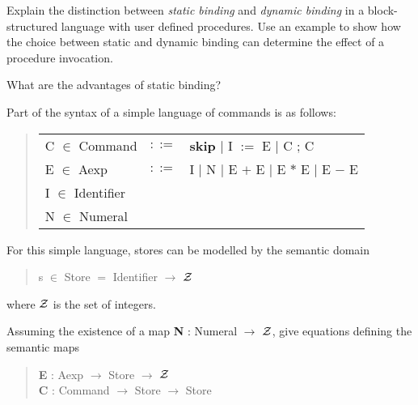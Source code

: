 \begin{questions}
\begin{subquestions}
		\subquestion

Explain the distinction between {\em static binding} and {\em dynamic binding}
in a block-structured language with user defined procedures.
Use an example to show how the choice between static and dynamic binding can
determine the effect of a procedure invocation.

What are the advantages of static binding?

	\end{subquestions}

	\question

Part of the syntax of a simple language of commands is as follows:

	\begin{quote}
	\begin{tabular}{lcl}
	 C $\in$ Command	&$::=$& {\bf skip}
				$\vert$ I $:=$ E
				$\vert$ C ; C \\
	 E $\in$ Aexp		&$::=$& I
				$\vert$ N
				$\vert$ E $+$ E
				$\vert$ E $*$ E
				$\vert$ E $-$ E	\\
	 I $\in$ Identifier \\
	 N $\in$ Numeral
        \end{tabular}
        \end{quote}

For this simple language, stores can be modelled by the semantic domain
        \begin{quote}
         s $\in$ Store $=$ Identifier $\rightarrow$ ${\cal Z}$
        \end{quote}
where ${\cal Z}$ is the set of integers.

	\begin{subquestions}

                \subquestion

Assuming the existence of a map
{\bf N} : Numeral $\rightarrow$ ${\cal Z}$,
give equations defining the semantic maps
        \begin{quote}
         {\bf E} : Aexp $\rightarrow$ Store $\rightarrow$ ${\cal Z}$ \\
         {\bf C} : Command $\rightarrow$ Store $\rightarrow$ Store
        \end{quote}

		\subquestion


\end{subquestions}
\end{questions}
